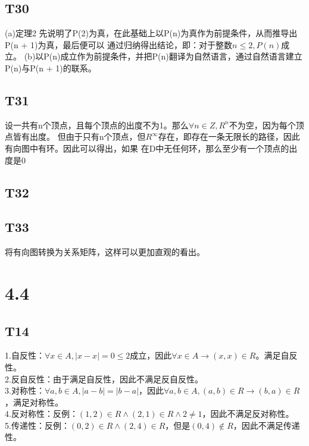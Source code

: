 \documentclass{article}
\begin{document}
\subsection{T30}
(a)定理2 先说明了P(2)为真，在此基础上以P(n)为真作为前提条件，从而推导出P(n + 1)为真，最后便可以
通过归纳得出结论，即：对于整数$n \leq 2,P(n)$成立。
(b)以P(n)成立作为前提条件，并把P(n)翻译为自然语言，通过自然语言建立P(n)与P(n + 1)的联系。
\subsection{T31}
设一共有n个顶点，且每个顶点的出度不为1。那么$\forall n \in Z, R^n$不为空，因为每个顶点皆有出度。
但由于只有n个顶点，但$R^{\infty}$存在，即存在一条无限长的路径，因此有向图中有环。因此可以得出，如果
在D中无任何环，那么至少有一个顶点的出度是0
\subsection{T32}
\subsection{T33}
将有向图转换为关系矩阵，这样可以更加直观的看出。
\section{4.4}
\subsection{T14}
1.自反性：$\forall x \in A, |x - x| = 0 \leq 2$成立，因此$\forall x \in A \rightarrow (x, x)\in R$。满足自反性。\\
2.反自反性：由于满足自反性，因此不满足反自反性。\\
3.对称性：$\forall a, b\in A, |a - b| = |b - a|$，因此$\forall a, b \in A, (a, b)\in R \rightarrow (b, a) \in R$，满足对称性。\\
4.反对称性：反例：$(1, 2) \in R \land (2, 1) \in R \land 2 \neq 1$，因此不满足反对称性。\\
5.传递性：反例：$(0, 2) \in R \land (2, 4) \in R$，但是$(0, 4) \notin R$，因此不满足传递性。\\
\end{document}
